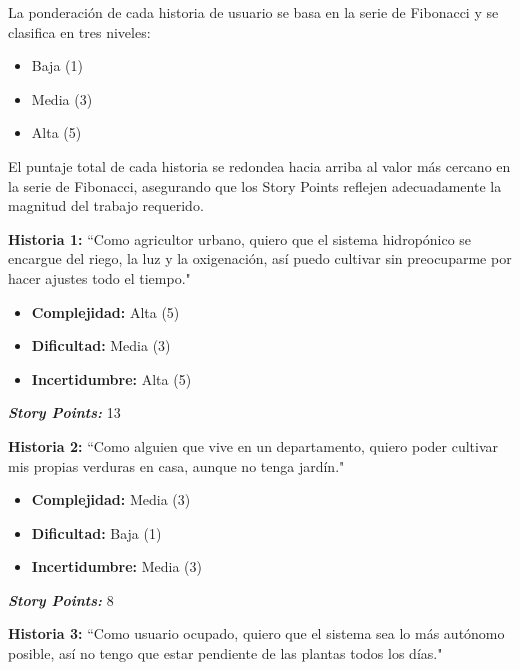 \documentclass[
11pt, %
]{charter}
\begin{document}

La ponderación de cada historia de usuario se basa en la serie de Fibonacci y se clasifica en tres niveles:

\begin{itemize}
    \item Baja (1)
    \item Media (3)
    \item Alta (5)
\end{itemize}

El puntaje total de cada historia se redondea hacia arriba al valor más cercano en la serie de Fibonacci, asegurando que los Story Points reflejen adecuadamente la magnitud del trabajo requerido.


\textbf{Historia 1:} ``Como agricultor urbano, quiero que el sistema hidropónico se encargue del riego, la luz y la oxigenación, así puedo cultivar sin preocuparme por hacer ajustes todo el tiempo."

        \begin{itemize}
            \item \textbf{Complejidad:} Alta (5)
            \item \textbf{Dificultad:} Media (3)
            \item \textbf{Incertidumbre:} Alta (5)
        \end{itemize}
        \textit{\textbf{Story Points:}} 13

\textbf{Historia 2:} ``Como alguien que vive en un departamento, quiero poder cultivar mis propias verduras en casa, aunque no tenga jardín."

        \begin{itemize}
            \item \textbf{Complejidad:} Media (3)
            \item \textbf{Dificultad:} Baja (1)
            \item \textbf{Incertidumbre:} Media (3)
        \end{itemize}
        \textit{\textbf{Story Points:}} 8

\textbf{Historia 3:} ``Como usuario ocupado, quiero que el sistema sea lo más autónomo posible, así no tengo que estar pendiente de las plantas todos los días."
\end{document}

